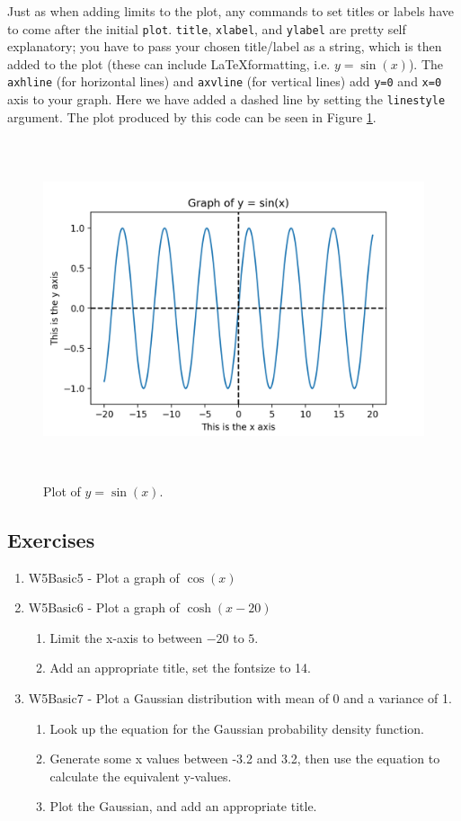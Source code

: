 \noindent Just as when adding limits to the plot, any commands to set titles or labels have to come after the initial \texttt{plot}. \texttt{title}, \texttt{xlabel}, and \texttt{ylabel} are pretty self explanatory; you have to pass your chosen title/label as a string, which is then added to the plot (these can include \LaTeX formatting, i.e. {\tt $y=\sin(x)$}). The \texttt{axhline} (for horizontal lines) and \texttt{axvline} (for vertical lines) add \texttt{y=0} and \texttt{x=0} axis to your graph. Here we have added a dashed line by setting the \texttt{linestyle} argument. The plot produced by this code can be seen in Figure \ref{fig:pysinx}.

\begin{figure}[H]
	\centering
	\includegraphics[height=10cm]{Figures/plotysinx.png}
\caption{Plot of $y=\sin(x)$.}
\label{fig:pysinx}
\end{figure}

\subsection{Exercises}
\begin{enumerate}
    \item W5Basic5 - Plot a graph of $\cos(x)$
    \item W5Basic6 - Plot a graph of $\cosh(x-20)$
    \begin{enumerate}
        \item Limit the x-axis to between $-20$ to $5$.
        \item Add an appropriate title, set the fontsize to 14.
    \end{enumerate}
    \item W5Basic7 - Plot a Gaussian distribution with mean of 0 and a variance of 1.
    \begin{enumerate}
        \item Look up the equation for the Gaussian probability density function.
        \item Generate some x values between -3.2 and 3.2, then use the equation to calculate the equivalent y-values.
        \item Plot the Gaussian, and add an appropriate title.
    \end{enumerate}
\end{enumerate}

